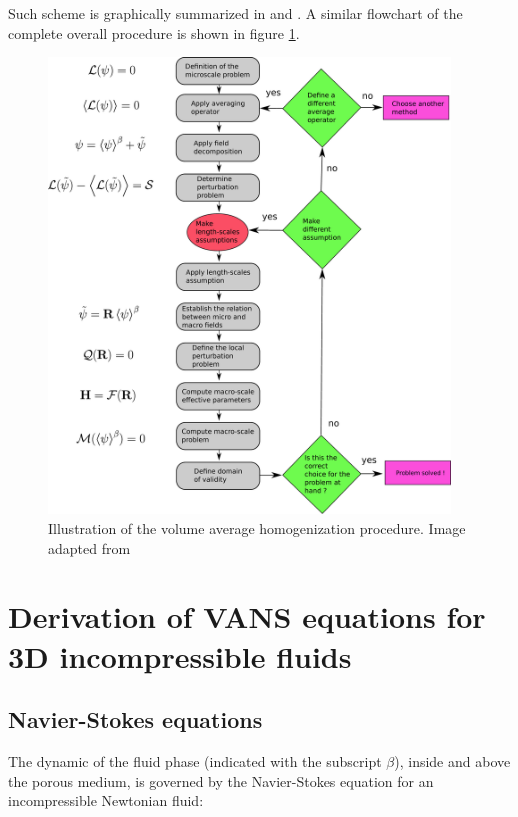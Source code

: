 Such scheme is graphically summarized in \citet{paez2017macroscopic} and \citet{davit2013homogenization}. A similar flowchart of the complete overall procedure is shown in figure \ref{fig:schema_vans_homo}.

\begin{figure}[h!]
	\centering
	\includegraphics[width=0.95\textwidth,height=0.95\textheight,keepaspectratio]{chapter_2/figure/schema}
	\caption{Illustration of the volume average homogenization procedure. Image adapted from \citet{davit2013homogenization}}
	\label{fig:schema_vans_homo}
\end{figure}

\section{Derivation of VANS equations for 3D incompressible fluids}
\subsection{Navier-Stokes equations}
The dynamic of the fluid phase (indicated with the subscript $\beta$), inside and above the porous medium, is governed by the Navier-Stokes equation for an incompressible Newtonian fluid:

